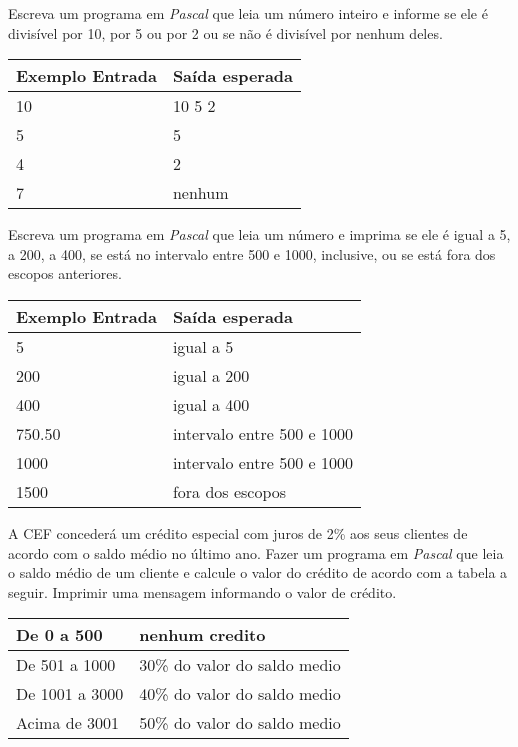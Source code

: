 \item Escreva um programa em \emph{Pascal} que leia um número inteiro e 
informe se ele é divisível por 10, por 5 ou por 2 ou se não é divisível 
por nenhum deles.

\begin{center}
\begin{tabular}{|l|l|} \hline
Exemplo Entrada & Saída esperada \\ \hline
10                &  10 5 2              \\ \hline
5                &  5              \\ \hline
4                &  2              \\ \hline
7               &  nenhum              \\ \hline
\end{tabular}
\end{center}

\item Escreva um programa em \emph{Pascal} que leia um número e imprima se 
ele é igual a 5, a 200, a 400, se está no intervalo entre 500 e 1000, 
inclusive, ou se está fora dos escopos anteriores.

\begin{center}
\begin{tabular}{|l|l|} \hline
Exemplo Entrada & Saída esperada \\ \hline
5                & igual a 5               \\ \hline
200                & igual a 200               \\ \hline
400                & igual a 400               \\ \hline
750.50                & intervalo entre 500 e 1000               \\ \hline
1000                & intervalo entre 500 e 1000               \\ \hline
1500                & fora dos escopos               \\ \hline
\end{tabular}
\end{center}

\item A CEF concederá um crédito especial com juros de 2\% aos seus clientes de 
acordo com o saldo médio no último ano. Fazer um programa em \emph{Pascal} que 
leia o saldo médio de um cliente e calcule o valor do crédito de acordo com a 
tabela a seguir. Imprimir uma mensagem informando o valor de crédito.

\begin{tabular}{|l|l|}\hline
De 0 a 500 & nenhum credito \\ \hline
De 501 a 1000 & 30\% do valor do saldo medio \\ \hline
De 1001 a 3000 & 40\% do valor do saldo medio \\ \hline
Acima de 3001 &  50\% do valor do saldo medio\\ \hline
\end{tabular}

